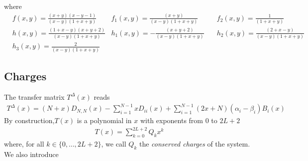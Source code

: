 \documentclass[10pt]{article}
\numberwithin{equation}{section}
\numberwithin{equation}{subsection}
\begin{document}
where
\begin{align}
	&f(x,y)=\frac{(x+y)(x-y-1)}{(x-y)(1+x+y)}&f_{1}(x,y)=\frac{(x+y)}{(x-y)(1+x+y)}\quad&f_{2}(x,y)=\frac{1}{(1+x+y)}\nonumber\\&h(x,y)=\frac{(1+x-y)(x+y+2)}{(x-y)(1+x+y)}
	&h_{1}(x,y)=-\frac{(x+y+2)}{(x-y)(1+x+y)}\quad&h_{2}(x,y)=\frac{(2+x-y)}{(x-y)(1+x+y)}\nonumber
	\\&h_{3}(x,y)=\frac{2}{(x-y)(1+x+y)}
\end{align}
\subsection{Charges}
The transfer matrix $T^{\Delta}(x)$ reads
\begin{equation}
	\begin{split}
		T^{\Delta}(x)=%
	(N+x)D_{N,N}(x)-\sum_{i=1}^{N-1}xD_{ii}(x)+\sum_{i=1}^{N-1}(2x+N)(\alpha_{i}-\beta_{i})B_{i}(x)
	\end{split}
\end{equation}
By construction,$T(x)$ is a polynomial in $x$ with exponents from $0$ to $2L+2$ 
\begin{equation}
	\begin{split}
		T(x)=
		\sum_{k=0}^{2L+2}Q_{k}x^{k}
	\end{split}
\end{equation}
where, for all $k\in\{0,\ldots,2L+2\}$, we call $Q_{k}$ the \textit{conserved charges} of the system. We also introduce 
\end{document}
